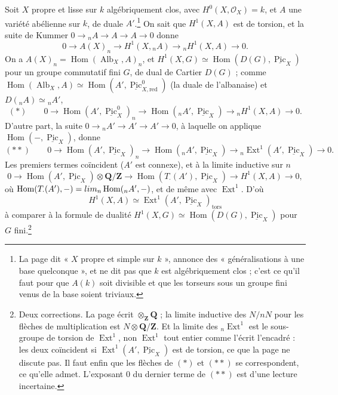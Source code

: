 \documentclass[11pt,a4paper]{article}
\begin{document}
Soit $X$ propre et lisse sur $k$ algébriquement clos, avec $H^0(X,
\mathcal{O}_X) = k$, et $A$ une variété abélienne sur $k$, de duale
$A'$.\footnote{La page dit « $X$ propre et simple sur $k$ », annonce des
« généralisations à une base quelconque », et ne dit pas que $k$ est
algébriquement clos ; c'est ce qu'il faut pour que $A(k)$ soit divisible et que les
torseurs sous un groupe fini venus de la base soient triviaux.} On sait que
$H^1(X, A)$ est de torsion, et la suite de Kummer $0 \to {}_nA \to A \to A \to 0$
donne
\[ 0 \to A(X)_n \to H^1(X, {}_nA) \to {}_nH^1(X, A) \to 0 . \]
On a $A(X)_n = \operatorname{Hom}(\operatorname{Alb}_X, A)_n$, et
$H^1(X, G) \simeq \operatorname{Hom}(D(G), \underline{\operatorname{Pic}}_X)$
pour un groupe commutatif fini $G$, de dual de Cartier $D(G)$ ; comme
$\operatorname{Hom}(\operatorname{Alb}_X, A) \simeq \operatorname{Hom}(A',
\underline{\operatorname{Pic}}^0_{X,\mathrm{red}})$ (la duale de l'albanaise) et $D({}_nA) \simeq {}_nA'$,
\[ (*) \qquad 0 \to \operatorname{Hom}(A', \underline{\operatorname{Pic}}^0_X)_n \to
\operatorname{Hom}({}_nA', \underline{\operatorname{Pic}}_X) \to {}_nH^1(X, A) \to 0 . \]
D'autre part, la suite $0 \to {}_nA' \to A' \to A' \to 0$, à laquelle on
applique $\operatorname{Hom}(-, \underline{\operatorname{Pic}}_X)$, donne
\[ (**) \qquad 0 \to \operatorname{Hom}(A', \underline{\operatorname{Pic}}_X)_n \to
\operatorname{Hom}({}_nA', \underline{\operatorname{Pic}}_X) \to
{}_n\operatorname{Ext}^1(A', \underline{\operatorname{Pic}}_X) \to 0 . \]
Les premiers termes coïncident ($A'$ est connexe), et à la limite inductive sur $n$
\[ 0 \to \operatorname{Hom}(A', \underline{\operatorname{Pic}}_X) \otimes
\mathbf{Q}/\mathbf{Z} \to \operatorname{Hom}(T_{\cdot}(A'),
\underline{\operatorname{Pic}}_X) \to H^1(X, A) \to 0 , \]
où $\operatorname{Hom}(T_\cdot(A'), -) = \varinjlim_n \operatorname{Hom}({}_nA',
-)$, et de même avec $\operatorname{Ext}^1$. D'où
\[ \boxed{H^1(X, A) \simeq \operatorname{Ext}^1(A',
\underline{\operatorname{Pic}}_X)_{\mathrm{tors}}} \]
à comparer à la formule de dualité $H^1(X, G) \simeq \operatorname{Hom}(D(G),
\underline{\operatorname{Pic}}_X)$ pour $G$ fini.\footnote{Deux corrections. La
page écrit $\otimes_{\mathbf{Z}} \mathbf{Q}$ ; la limite inductive des $N/nN$
pour les flèches de multiplication est $N \otimes \mathbf{Q}/\mathbf{Z}$. Et la
limite des ${}_n\operatorname{Ext}^1$ est le sous-groupe de torsion de
$\operatorname{Ext}^1$, non $\operatorname{Ext}^1$ tout entier comme l'écrit
l'encadré : les deux coïncident si $\operatorname{Ext}^1(A',
\underline{\operatorname{Pic}}_X)$ est de torsion, ce que la page ne discute pas.
Il faut enfin que les flèches de $(*)$ et $(**)$ se correspondent, ce qu'elle
admet. L'exposant $0$ du dernier terme de $(**)$ est d'une lecture incertaine.}
\end{document}
